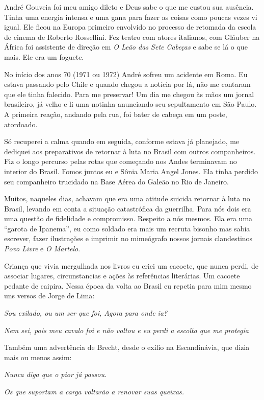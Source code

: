 André Gouveia foi meu amigo dileto e Deus sabe o que me custou sua
ausência. Tinha uma energia intensa e uma gana para fazer as coisas como
poucas vezes vi igual. Ele ficou na Europa primeiro envolvido no
processo de retomada da escola de cinema de Roberto Rossellini. Fez
teatro com atores italianos, com Gláuber na África foi assistente de
direção em {\it O Leão das Sete Cabeças} e sabe se lá o que mais. Ele
era um foguete.

No início dos anos 70 (1971 ou 1972) André sofreu um acidente em Roma.
Eu estava passando pelo Chile e quando chegou a notícia por lá, não me
contaram que ele tinha falecido. Para me preservar! Um dia me chegou às
mãos um jornal brasileiro, já velho e li uma notinha anunciando seu
sepultamento em São Paulo. A primeira reação, andando pela rua, foi
bater de cabeça em um poste, atordoado.

Só recuperei a calma quando em seguida, conforme estava já planejado, me
dediquei aos preparativos de retornar à luta no Brasil com outros
companheiros. Fiz o longo percurso pelas rotas que começando nos Andes
terminavam no interior do Brasil. Fomos juntos eu e Sônia Maria Angel
Jones. Ela tinha perdido seu companheiro trucidado na Base Aérea do
Galeão no Rio de Janeiro.

Muitos, naqueles dias, achavam que era uma atitude suicida retornar à
luta no Brasil, levando em conta a situação catastrófica da guerrilha.
Para nós dois era uma questão de fidelidade e compromisso. Respeito a
nós mesmos. Ela era uma “garota de Ipanema”, eu como soldado era mais um
recruta bisonho mas sabia escrever, fazer ilustrações e imprimir no
mimeógrafo nossos jornais clandestinos {\it Povo Livre} e {\it O
Martelo}.

Criança que vivia mergulhada nos livros eu criei um cacoete, que nunca
perdi, de associar lugares, circunstancias e ações às referências
literárias. Um cacoete pedante de caipira. Nessa época da volta ao
Brasil eu repetia para mim mesmo uns versos de Jorge de Lima:

\startblockquote
{\it Sou exilado, ou um ser que foi, Agora para onde ia?}

{\it Nem sei, pois meu cavalo foi e não voltou e eu perdi a escolta que
me protegia}

Também uma advertência de Brecht, desde o exílio na Escandinávia, que
dizia mais ou menos assim:

{\it Nunca diga que o pior já passou.}

{\it Os que suportam a carga voltarão a renovar suas queixas.}

